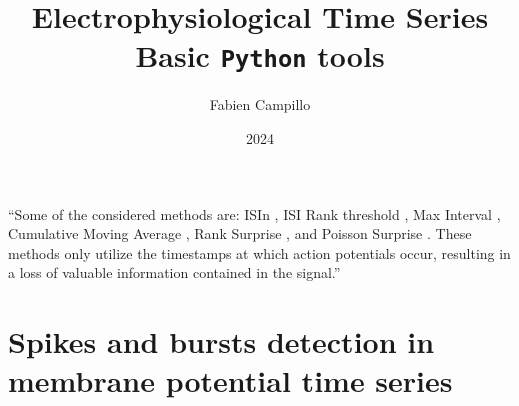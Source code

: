\documentclass[a4paper,9pt]{extarticle}
\title{
\color{SecColor}
Electrophysiological Time Series \\[1em]
Basic \texttt{Python} tools
}
\begin{document}

\setlength{\baselineskip}{10.5pt plus .15pt minus 0.1pt}


\author{Fabien Campillo}
\date{2024}
  

\maketitle




``Some of the considered methods are: ISIn \cite{bakkum2013a}, ISI Rank
threshold \cite{hennig2011a}, Max Interval \cite{kirillov2024a}, Cumulative Moving Average \cite{kapucu2012b}, Rank Surprise \cite{gourevitch2007a}, and Poisson Surprise \cite{legendy1985a}. These
methods only utilize the timestamps at which action
potentials occur, resulting in a loss of valuable information
contained in the signal.'' \cite{ardelean2023b}

\nocite{ardelean2023a,muresan2022a,ardelean2023b}

\section{Spikes and bursts detection in membrane potential time series}
\end{document}
